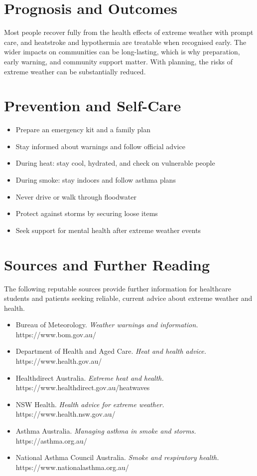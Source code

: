 \section*{Prognosis and Outcomes}
Most people recover fully from the health effects of extreme weather with prompt care, and heatstroke and hypothermia are treatable when recognised early. The wider impacts on communities can be long-lasting, which is why preparation, early warning, and community support matter. With planning, the risks of extreme weather can be substantially reduced.

\section*{Prevention and Self-Care}
\begin{itemize}
    \item Prepare an emergency kit and a family plan
    \item Stay informed about warnings and follow official advice
    \item During heat: stay cool, hydrated, and check on vulnerable people
    \item During smoke: stay indoors and follow asthma plans
    \item Never drive or walk through floodwater
    \item Protect against storms by securing loose items
    \item Seek support for mental health after extreme weather events
\end{itemize}

\section*{Sources and Further Reading}
The following reputable sources provide further information for healthcare students and patients seeking reliable, current advice about extreme weather and health.
\begin{itemize}
    \item Bureau of Meteorology. \textit{Weather warnings and information.} https://www.bom.gov.au/
    \item Department of Health and Aged Care. \textit{Heat and health advice.} https://www.health.gov.au/
    \item Healthdirect Australia. \textit{Extreme heat and health.} https://www.healthdirect.gov.au/heatwaves
    \item NSW Health. \textit{Health advice for extreme weather.} https://www.health.nsw.gov.au/
    \item Asthma Australia. \textit{Managing asthma in smoke and storms.} https://asthma.org.au/
    \item National Asthma Council Australia. \textit{Smoke and respiratory health.} https://www.nationalasthma.org.au/
\end{itemize}
